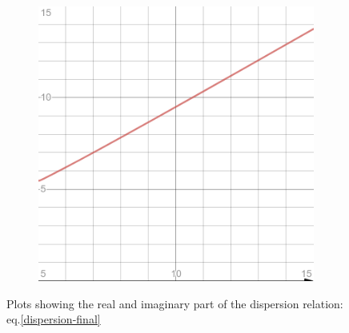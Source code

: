 \documentclass[a4paper, 12pt]{article}
\begin{document}
\begin{figure}[t]
\begin{subfigure}{0.5\textwidth}
    \includegraphics[scale=0.2]{disp_imgwvsk.png}
    \label{disp-img-base}
    \end{subfigure}
    \caption{Plots showing the real and imaginary part of the dispersion relation: eq.\eqref{dispersion-final}}
\end{figure}
\end{document}
